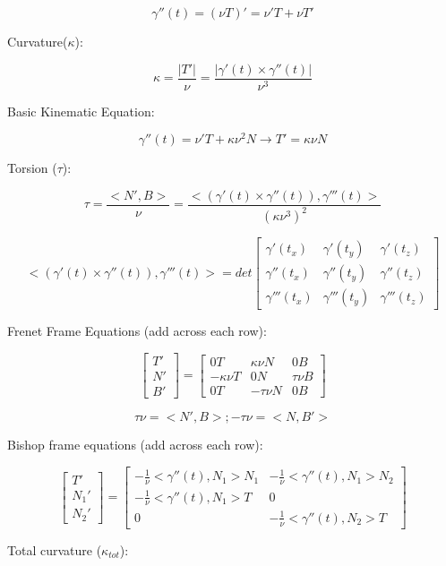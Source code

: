 \documentclass{article}
\begin{document}
 \[ \gamma''(t) = (\nu T)' = \nu'T + \nu T' \]
 
 Curvature($\kappa$):
 
  \[ \kappa = \frac{|T'|}{\nu} = \frac{|\gamma'(t) \times \gamma''(t)|}{\nu^3}\] 
  
  Basic Kinematic Equation:
 
 \[ \gamma''(t)  = \nu'T + \kappa \nu^2 N \rightarrow T' = \kappa \nu N \]
 
 Torsion ($\tau$):
 
  \[ \tau = \frac{<N',B>}{\nu}  = \frac{<(\gamma'(t) \times \gamma''(t)), \gamma'''(t)>}{(\kappa \nu^3)^2}\]
  
   \[
  <(\gamma'(t) \times \gamma''(t)), \gamma'''(t)> =
  det
  \begin{bmatrix}
\gamma'(t_{x}) & \gamma'(t_{y}) & \gamma'(t_{z})\\
\gamma''(t_{x}) & \gamma''(t_{y}) & \gamma''(t_{z})\\
 \gamma'''(t_{x}) & \gamma'''(t_{y}) & \gamma'''(t_{z})
\end{bmatrix}
 \]
  
  Frenet Frame Equations (add across each row):
  
  \[ 
\begin{bmatrix}
T' \\
N' \\
B' 
\end{bmatrix}
=
\begin{bmatrix}
0T & \kappa \nu N & 0B\\
-\kappa \nu T & 0N & \tau \nu B\\
 0T& -\tau \nu N & 0B
\end{bmatrix}
 \]
 
 \[ \tau \nu = <N', B>; -\tau \nu = <N, B'> \]
 
 Bishop frame equations (add across each row):
 
 \[ 
\begin{bmatrix}
T' \\
N_{1}' \\
N_{2}' 
\end{bmatrix}
=
\begin{bmatrix}
-\frac{1}{\nu}<\gamma''(t), N_{1}>N_{1} & -\frac{1}{\nu}<\gamma''(t), N_{1}>N_{2} \\
-\frac{1}{\nu}<\gamma''(t), N_{1}>T & 0\\
0 & -\frac{1}{\nu}<\gamma''(t), N_{2}>T
\end{bmatrix}
 \]
 
 Total curvature ($\kappa_{tot}$):
 
\end{document}
